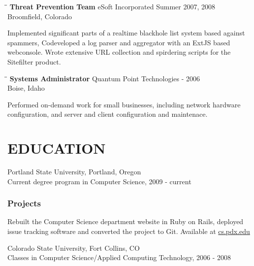 \documentclass{res}
\begin{document}
\begin{resume}
  \vspace{-0.21in}

  \begin{tabbing}%
  \hspace{2.3in}\= \hspace{2.6in}\= \kill %
  {\bf Threat Prevention Team}  \>eSoft Incorporated \> Summer 2007, 2008\\
			\>Broomfield, Colorado
  \end{tabbing}\vspace{-20pt}
  Implemented significant parts of a realtime blackhole list system based
  against spammers, Codeveloped a log parser and aggregator with an ExtJS
  based webconsole. Wrote extensive URL collection and spirdering
  scripts for the Sitefilter product.

  \vspace{-0.21in}

  \begin{tabbing}%
  \hspace{2.3in}\= \hspace{2.6in}\= \kill %
  {\bf Systems Administrator} \>Quantum Point Technologies - 2006\\
			\>Boise, Idaho
  \end{tabbing}\vspace{-20pt}
  Performed on-demand work for small businesses, including network hardware
  configuration, and server and client configuration and maintenace.

\vspace{-0.1in}

\section{EDUCATION}
  Portland State University, Portland, Oregon \\
  Current degree program in Computer Science, 2009 - current \\
  \vspace{-0.5in}
  \subsubsection{Projects}
  \vspace{-0.2in}
    Rebuilt the Computer Science department website in Ruby on Rails, deployed
    issue tracking software and converted the project to Git. Available at \url{cs.pdx.edu}

  \vspace{-0.2in}
  Colorado State University, Fort Collins, CO \\
  Classes in Computer Science/Applied Computing Technology, 2006 - 2008 \\
  \vspace{-0.5in}

\end{resume}
\end{document}
